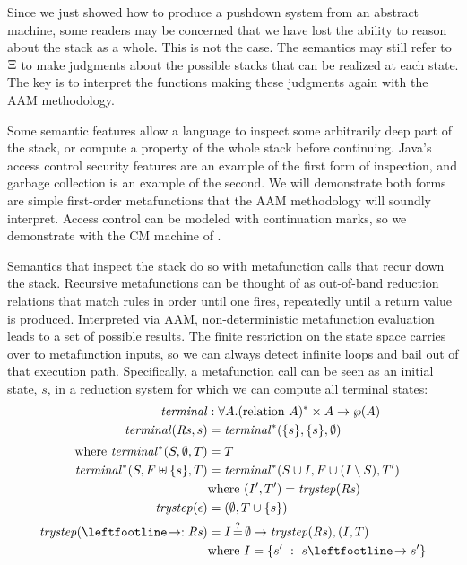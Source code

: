 Since we just showed how to produce a pushdown system from an abstract machine, some readers may be concerned that we have lost the ability to reason about the stack as a whole.
%
This is not the case.
%
The semantics may still refer to $\Xi$ to make judgments about the possible stacks that can be realized at each state.
%
The key is to interpret the functions making these judgments again with the AAM methodology.

%
Some semantic features allow a language to inspect some arbitrarily deep part of the stack, or compute a property of the whole stack before continuing.
%
Java's access control security features are an example of the first form of inspection, and garbage collection is an example of the second.
%
We will demonstrate both forms are simple first-order metafunctions that the AAM methodology will soundly interpret.
%
Access control can be modeled with continuation marks, so we demonstrate with the CM machine of \citeauthor{dvanhorn:Clements2004Tailrecursive}.

Semantics that inspect the stack do so with metafunction calls that recur down the stack.
%
Recursive metafunctions can be thought of as out-of-band reduction relations that match rules in order until one fires, repeatedly until a return value is produced.
%
Interpreted via AAM, non-deterministic metafunction evaluation leads to a set of possible results.
%
The finite restriction on the state space carries over to metafunction inputs, so we can always detect infinite loops and bail out of that execution path.
%
Specifically, a metafunction call can be seen as an initial state, $s$, in a reduction system for which we can compute all terminal states:
\begin{align*}
  \terminal &: \forall A. (\text{relation } A)^* \times A \to \wp(A) \\
  \terminal(\mathit{Rs},s) &= \terminalaux(\set{s},\set{s},\emptyset) \\[2pt]
  \text{where } \terminalaux(S, \emptyset, T) &= T \\
   \terminalaux(S, F \uplus \set{s}, T) &= \terminalaux(S\cup I, F \cup (I \setminus S), T') \\
   & \text{where } (I',T') = \trystep(\mathit{Rs}) \\
   \trystep(\epsilon) &= (\emptyset,T\cup\set{s}) \\
   \trystep(\stepto:\mathit{Rs}) &= I\deceq\emptyset \to \trystep(\mathit{Rs}), (I, T) \\
    & \text{where } I = \setbuild{s'}{s \stepto s'}
\end{align*}

